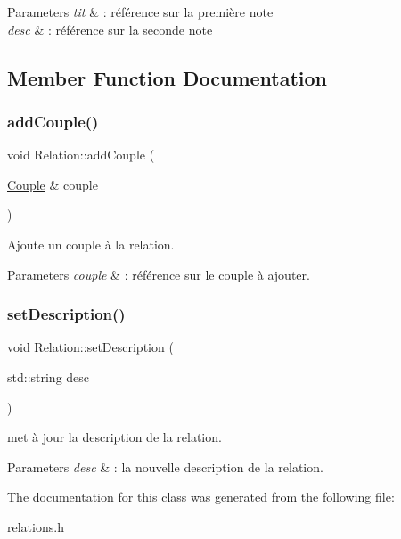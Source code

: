 \begin{DoxyParams}{Parameters}
{\em tit} & \+: référence sur la première note \\
\hline
{\em desc} & \+: référence sur la seconde note \\
\hline
\end{DoxyParams}


\subsection{Member Function Documentation}
\mbox{\label{class_relation_ad51e21a7258d6980f479dbb21f9e510c}} 
\subsubsection{\texorpdfstring{add\+Couple()}{addCouple()}}
{\footnotesize\ttfamily void Relation\+::add\+Couple (\begin{DoxyParamCaption}\item[{\hyperlink{class_couple}{Couple} \&}]{couple }\end{DoxyParamCaption})\hspace{0.3cm}{\ttfamily [inline]}}



Ajoute un couple à la relation. 


\begin{DoxyParams}{Parameters}
{\em couple} & \+: référence sur le couple à ajouter. \\
\hline
\end{DoxyParams}
\mbox{\label{class_relation_a481de051dc44065bb816b9b94b5d0c48}} 
\subsubsection{\texorpdfstring{set\+Description()}{setDescription()}}
{\footnotesize\ttfamily void Relation\+::set\+Description (\begin{DoxyParamCaption}\item[{std\+::string}]{desc }\end{DoxyParamCaption})\hspace{0.3cm}{\ttfamily [inline]}}



met à jour la description de la relation. 


\begin{DoxyParams}{Parameters}
{\em desc} & \+: la nouvelle description de la relation. \\
\hline
\end{DoxyParams}


The documentation for this class was generated from the following file\+:\begin{DoxyCompactItemize}
\item 
relations.\+h\end{DoxyCompactItemize}
